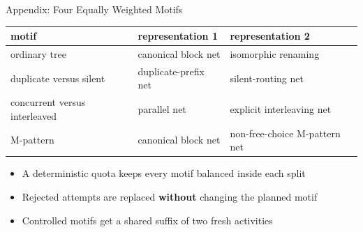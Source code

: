 \documentclass[aspectratio=169]{beamer}
\newcommand{\keya}[1]{\textbf{\textcolor{laraamber!85!black}{#1}}}
\begin{document}
\begin{frame}{Appendix: Four Equally Weighted Motifs}
  \begin{center}
  \small
  \begin{tabular}{lll}
    \toprule
    motif & representation 1 & representation 2 \\
    \midrule
    ordinary tree & canonical block net & isomorphic renaming \\
    duplicate versus silent & duplicate-prefix net & silent-routing net \\
    concurrent versus interleaved & parallel net & explicit interleaving net \\
    M-pattern & canonical block net & non-free-choice M-pattern net \\
    \bottomrule
  \end{tabular}
  \end{center}
  \vspace{3mm}
  \begin{itemize}\setlength{\itemsep}{5pt}
    \item A deterministic quota keeps every motif balanced inside each split
    \item Rejected attempts are replaced \keya{without} changing the planned motif
    \item Controlled motifs get a shared suffix of two fresh activities
  \end{itemize}
\end{frame}
\end{document}

